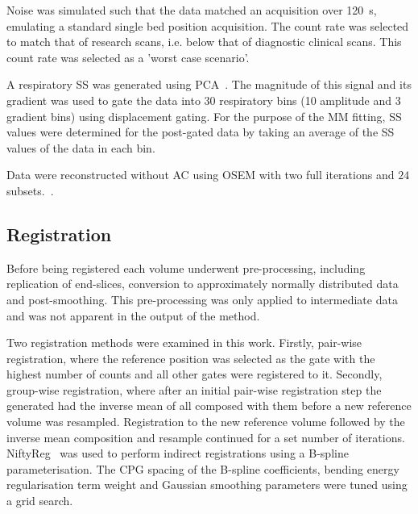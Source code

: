         Noise was simulated such that the data matched an acquisition over \SI{120}{\second}, emulating a standard single bed position acquisition. The count rate was selected to match that of research scans, i.e. below that of diagnostic clinical scans. This count rate was selected as a 'worst case scenario'.
        
        A respiratory \gls{SS} was generated using \gls{PCA}~\cite{Thielemans2011}. The magnitude of this signal and its gradient was used to gate the data into $30$ respiratory bins (10 amplitude and 3 gradient bins) using displacement gating. For the purpose of the \gls{MM} fitting, \gls{SS} values were determined for the post-gated data by taking an average of the \gls{SS} values of the data in each bin.
        
        Data were reconstructed without \gls{AC} using OSEM with two full iterations and $24$ subsets.~\cite{Hudson1994}.
    
    \vspace{-0.3cm}
    
    \subsection{Registration} \label{sec:registration}
        Before being registered each volume underwent pre-processing, including replication of end-slices, conversion to approximately normally distributed data and post-smoothing. This pre-processing was only applied to intermediate data and was not apparent in the output of the method.%
        
        Two registration methods were examined in this work. Firstly, pair-wise registration, where the reference position was selected as the gate with the highest number of counts and all other gates were registered to it. Secondly, group-wise registration, where after an initial pair-wise registration step the  generated had the inverse mean of all  composed with them before a new reference volume was resampled. Registration to the new reference volume followed by the inverse mean composition and resample continued for a set number of iterations. NiftyReg~\cite{Modat2010} was used to perform indirect registrations using a B-spline parameterisation. The \gls{CPG} spacing of the B-spline coefficients, bending energy regularisation term weight and Gaussian smoothing parameters were tuned using a grid search.
    
